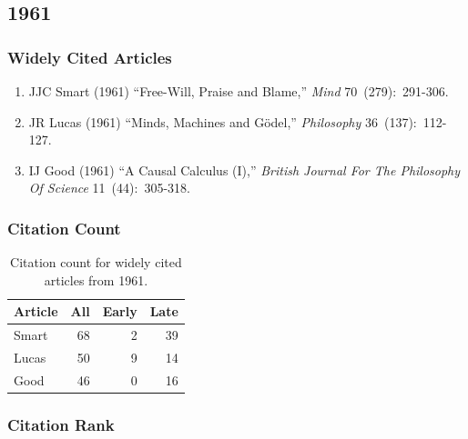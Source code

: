\documentclass[
  10pt,
  letterpaper,
  DIV=11,
  numbers=noendperiod,
  twoside]{scrartcl}
\providecommand{\tightlist}{%
  \setlength{\itemsep}{0pt}\setlength{\parskip}{0pt}}\usepackage{longtable,booktabs,array}
\begin{document}
\newpage

\subsection{1961}\label{sec-s1961}

\subsubsection*{Widely Cited Articles}\label{widely-cited-articles-5}

\begin{enumerate}
\def\labelenumi{\arabic{enumi}.}
\tightlist
\item
  JJC Smart (1961) ``Free-Will, Praise and Blame,'' \emph{Mind}
  70~(279):~291-306.
\item
  JR Lucas (1961) ``Minds, Machines and Gödel,'' \emph{Philosophy}
  36~(137):~112-127.
\item
  IJ Good (1961) ``A Causal Calculus (I),'' \emph{British Journal For
  The Philosophy Of Science} 11~(44):~305-318.
\end{enumerate}

\subsubsection*{Citation Count}\label{sec-count-1961}

\begin{longtable}[]{@{}lrrr@{}}

\caption{\label{tbl-citation-count-1961}Citation count for widely cited
articles from 1961.}

\tabularnewline

\toprule\noalign{}
Article & All & Early & Late \\
\midrule\noalign{}
\endhead
\bottomrule\noalign{}
\endlastfoot
Smart & 68 & 2 & 39 \\
Lucas & 50 & 9 & 14 \\
Good & 46 & 0 & 16 \\

\end{longtable}

\subsubsection*{Citation Rank}\label{sec-rank-1961}
\end{document}
